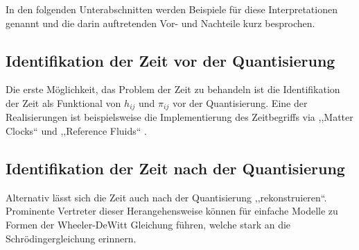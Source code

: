\documentclass{scrartcl}
\begin{document}
		In den folgenden Unterabschnitten werden Beispiele für diese Interpretationen genannt
		und die darin auftretenden Vor- und Nachteile kurz besprochen.
		\subsection{Identifikation der Zeit vor der Quantisierung} %
			Die erste Möglichkeit, das Problem der Zeit zu behandeln ist die Identifikation der
			Zeit als Funktional von $h_{ij}$ und $\pi_{ij}$ vor der Quantisierung. Eine der Realisierungen
			ist beispielsweise die Implementierung des Zeitbegriffs via ,,Matter Clocks`` und ,,Reference Fluids`` \cite{PhysRevD.43.419,gr-qc/9210011}. %
		\subsection{Identifikation der Zeit nach der Quantisierung} %
			Alternativ lässt sich die Zeit auch nach der Quantisierung ,,rekonstruieren``. Prominente 
			Vertreter dieser Herangehensweise können für einfache Modelle zu Formen der Wheeler-DeWitt Gleichung
			führen, welche stark an die Schrödingergleichung erinnern.
			
\end{document}

